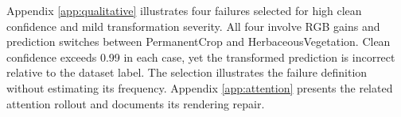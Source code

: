 Appendix \ref{app:qualitative} illustrates four failures selected for high clean confidence and mild transformation severity. All four involve RGB gains and prediction switches between PermanentCrop and HerbaceousVegetation. Clean confidence exceeds 0.99 in each case, yet the transformed prediction is incorrect relative to the dataset label. The selection illustrates the failure definition without estimating its frequency. Appendix \ref{app:attention} presents the related attention rollout and documents its rendering repair.
